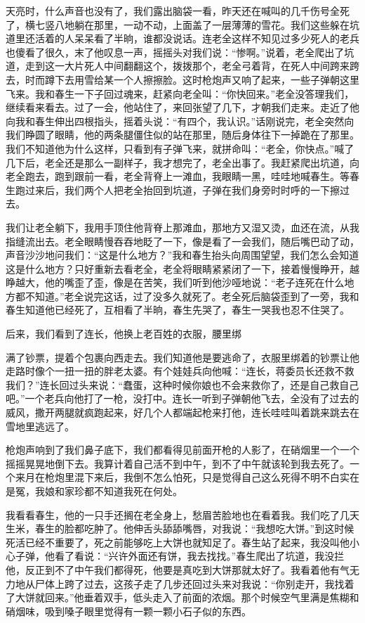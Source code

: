 \documentclass[12pt,UTF8]{ctexbook}
\begin{document}
天亮时，什么声音也没有了，我们露出脑袋一看，昨天还在喊叫的几千伤号全死了，横七竖八地躺在那里，一动不动，上面盖了一层薄薄的雪花。我们这些躲在坑道里还活着的人呆呆看了半晌，谁都没说话。连老全这样不知见过多少死人的老兵也傻看了很久，末了他叹息一声，摇摇头对我们说：“惨啊。”说着，老全爬出了坑道，走到这一大片死人中间翻翻这个，拨拨那个，老全弓着背，在死人中间跨来跨去，时而蹲下去用雪给某一个人擦擦脸。这时枪炮声又响了起来，一些子弹朝这里飞来。我和春生一下子回过魂来，赶紧向老全叫：“你快回来。”老全没答理我们，继续看来看去。过了一会，他站住了，来回张望了几下，才朝我们走来。走近了他向我和春生伸出四根指头，摇着头说：“有四个，我认识。”话刚说完，老全突然向我们睁圆了眼睛，他的两条腿僵住似的站在那里，随后身体往下一掉跪在了那里。我们不知道他为什么这样，只看到有子弹飞来，就拼命叫：“老全，你快点。”喊了几下后，老全还是那么一副样子，我才想完了，老全出事了。我赶紧爬出坑道，向老全跑去，跑到跟前一看，老全背脊上一滩血，我眼睛一黑，哇哇地喊春生。等春生跑过来后，我们两个人把老全抬回到坑道，子弹在我们身旁时时呼的一下擦过去。

我们让老全躺下，我用手顶住他背脊上那滩血，那地方又湿又烫，血还在流，从我指缝流出去。老全眼睛慢吞吞地眨了一下，像是看了一会我们，随后嘴巴动了动，声音沙沙地问我们：“这是什么地方？”我和春生抬头向周围望望，我们怎么会知道这是什么地方？只好重新去看老全，老全将眼睛紧紧闭了一下，接着慢慢睁开，越睁越大，他的嘴歪了歪，像是在苦笑，我们听到他沙哑地说：“老子连死在什么地方都不知道。”老全说完这话，过了没多久就死了。老全死后脑袋歪到了一旁，我和春生知道他已经死了，互相看了半晌，春生先哭了，春生一哭我也忍不住哭了。

后来，我们看到了连长，他换上老百姓的衣服，腰里绑


满了钞票，提着个包裹向西走去。我们知道他是要逃命了，衣服里绑着的钞票让他走路时像个一扭一扭的胖老太婆。有个娃娃兵向他喊：“连长，蒋委员长还救不救我们？”连长回过头来说：“蠢蛋，这种时候你娘也不会来救你了，还是自己救自己吧。”一个老兵向他打了一枪，没打中。连长一听到子弹朝他飞去，全没有了过去的威风，撒开两腿就疯跑起来，好几个人都端起枪来打他，连长哇哇叫着跳来跳去在雪地里逃远了。

枪炮声响到了我们鼻子底下，我们都看得见前面开枪的人影了，在硝烟里一个一个摇摇晃晃地倒下去。我算计着自己活不到中午，到不了中午就该轮到我去死了。一个来月在枪炮里混下来后，我倒不怎么怕死，只是觉得自己这么死得不明不白实在是冤，我娘和家珍都不知道我死在何处。

我看看春生，他的一只手还搁在老全身上，愁眉苦脸地也在看着我。我们吃了几天生米，春生的脸都吃肿了。他伸舌头舔舔嘴唇，对我说：“我想吃大饼。”到这时候死活已经不重要了，死之前能够吃上大饼也就知足了。春生站了起来，我没叫他小心子弹，他看了看说：“兴许外面还有饼，我去找找。”春生爬出了坑道，我没拦他，反正到不了中午我们都得死，他要是真吃到大饼那就太好了。我看着他有气无力地从尸体上跨了过去，这孩子走了几步还回过头来对我说：“你别走开，我找着了大饼就回来。”他垂着双手，低头走入了前面的浓烟。那个时候空气里满是焦糊和硝烟味，吸到嗓子眼里觉得有一颗一颗小石子似的东西。
\end{document}

